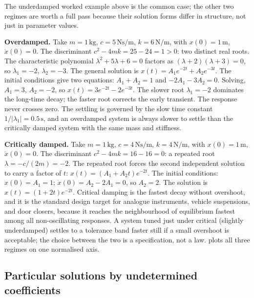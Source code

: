 The underdamped worked example above is the common case; the other
two regimes are worth a full pass because their solution forms differ
in structure, not just in parameter values.

\textbf{Overdamped.} Take $m = 1\,\si{\kilogram}$,
$c = 5\,\si{\newton\second\per\meter}$,
$k = 6\,\si{\newton\per\meter}$, with $x(0) = 1\,\si{\meter}$,
$\dot{x}(0) = 0$. The discriminant $c^{2} - 4mk = 25 - 24 = 1 > 0$:
two distinct real roots. The characteristic polynomial $\lambda^{2}
+ 5\lambda + 6 = 0$ factors as $(\lambda + 2)(\lambda + 3) = 0$, so
$\lambda_{1} = -2$, $\lambda_{2} = -3$. The general solution is
$x(t) = A_{1} e^{-2t} + A_{2} e^{-3t}$. The initial conditions give
two equations: $A_{1} + A_{2} = 1$ and $-2 A_{1} - 3 A_{2} = 0$.
Solving, $A_{1} = 3$, $A_{2} = -2$, so $x(t) = 3 e^{-2t} - 2 e^{-3t}$.
The slower root $\lambda_{1} = -2$ dominates the long-time decay; the
faster root corrects the early transient. The response never crosses
zero. The settling is governed by the slow time constant
$1/|\lambda_{1}| = 0.5\,\si{\second}$, and an overdamped system is
always slower to settle than the critically damped system with the
same mass and stiffness.

\textbf{Critically damped.} Take $m = 1\,\si{\kilogram}$,
$c = 4\,\si{\newton\second\per\meter}$,
$k = 4\,\si{\newton\per\meter}$, with $x(0) = 1\,\si{\meter}$,
$\dot{x}(0) = 0$. The discriminant $c^{2} - 4mk = 16 - 16 = 0$: a
repeated root $\lambda = -c/(2m) = -2$. The repeated root forces the
second independent solution to carry a factor of $t$: $x(t) =
(A_{1} + A_{2} t) e^{-2t}$. The initial conditions: $x(0) = A_{1} =
1$; $\dot{x}(0) = A_{2} - 2 A_{1} = 0$, so $A_{2} = 2$. The solution
is $x(t) = (1 + 2t) e^{-2t}$. Critical damping is the fastest decay
without overshoot, and it is the standard design target for analogue
instruments, vehicle suspensions, and door closers, because it
reaches the neighbourhood of equilibrium fastest among all
non-oscillating responses. A system tuned just under critical
(slightly underdamped) settles to a tolerance band faster still if a
small overshoot is acceptable; the choice between the two is a
specification, not a law. 
plots all three regimes on one normalised axis.

\subsection{Particular solutions by undetermined coefficients}

